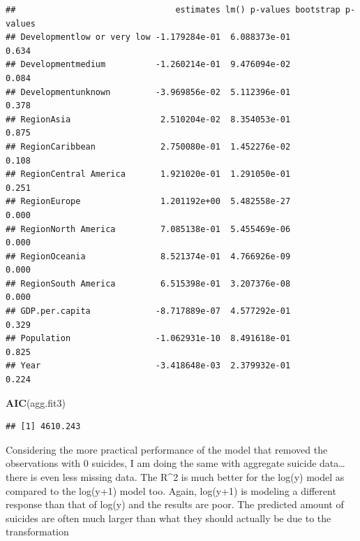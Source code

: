\documentclass[11pt,]{article}
\newenvironment{Shaded}{\begin{snugshade}}{\end{snugshade}}
\newcommand{\CommentTok}[1]{\textcolor[rgb]{0.56,0.35,0.01}{\textit{#1}}}
\newcommand{\DecValTok}[1]{\textcolor[rgb]{0.00,0.00,0.81}{#1}}
\newcommand{\KeywordTok}[1]{\textcolor[rgb]{0.13,0.29,0.53}{\textbf{#1}}}
\newcommand{\NormalTok}[1]{#1}
\newcommand{\OperatorTok}[1]{\textcolor[rgb]{0.81,0.36,0.00}{\textbf{#1}}}
\newcommand{\StringTok}[1]{\textcolor[rgb]{0.31,0.60,0.02}{#1}}
\begin{document}
\begin{Shaded}
\end{Shaded}

\begin{verbatim}
##                                estimates lm() p-values bootstrap p-values
## Developmentlow or very low -1.179284e-01  6.088373e-01              0.634
## Developmentmedium          -1.260214e-01  9.476094e-02              0.084
## Developmentunknown         -3.969856e-02  5.112396e-01              0.378
## RegionAsia                  2.510204e-02  8.354053e-01              0.875
## RegionCaribbean             2.750080e-01  1.452276e-02              0.108
## RegionCentral America       1.921020e-01  1.291050e-01              0.251
## RegionEurope                1.201192e+00  5.482558e-27              0.000
## RegionNorth America         7.085138e-01  5.455469e-06              0.000
## RegionOceania               8.521374e-01  4.766926e-09              0.000
## RegionSouth America         6.515398e-01  3.207376e-08              0.000
## GDP.per.capita             -8.717889e-07  4.577292e-01              0.329
## Population                 -1.062931e-10  8.491618e-01              0.825
## Year                       -3.418648e-03  2.379932e-01              0.224
\end{verbatim}

\begin{Shaded}
\begin{Highlighting}[]
\KeywordTok{AIC}\NormalTok{(agg.fit3)}
\end{Highlighting}
\end{Shaded}

\begin{verbatim}
## [1] 4610.243
\end{verbatim}

Considering the more practical performance of the model that removed the
observations with 0 suicides, I am doing the same with aggregate suicide
data\ldots{} there is even less missing data. The R\^{}2 is much better
for the log(y) model as compared to the log(y+1) model too. Again,
log(y+1) is modeling a different response than that of log(y) and the
results are poor. The predicted amount of suicides are often much larger
than what they should actually be due to the transformation
\end{document}
